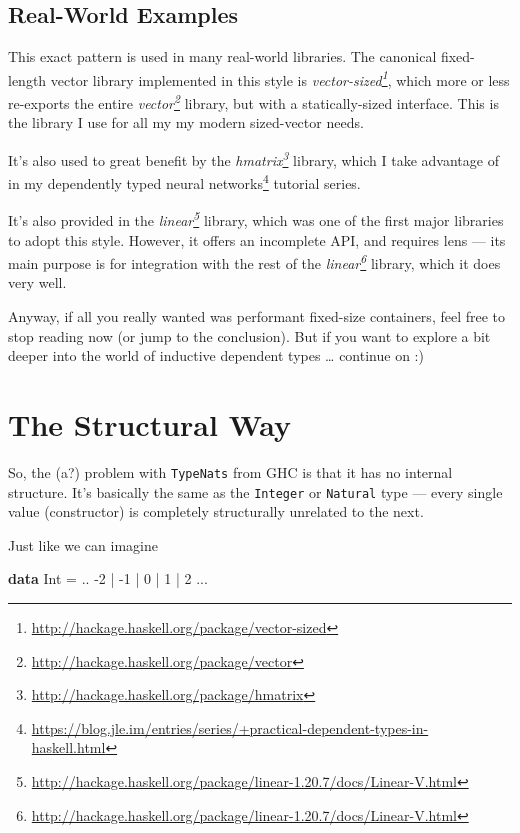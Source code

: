 \documentclass[]{article}
\newenvironment{Shaded}{}{}
\newcommand{\KeywordTok}[1]{\textcolor[rgb]{0.00,0.44,0.13}{\textbf{#1}}}
\newcommand{\DataTypeTok}[1]{\textcolor[rgb]{0.56,0.13,0.00}{#1}}
\newcommand{\DecValTok}[1]{\textcolor[rgb]{0.25,0.63,0.44}{#1}}
\newcommand{\FunctionTok}[1]{\textcolor[rgb]{0.02,0.16,0.49}{#1}}
\renewcommand{\href}[2]{#2\footnote{\url{#1}}}
\begin{document}
\subsection{Real-World Examples}\label{real-world-examples}

This exact pattern is used in many real-world libraries. The canonical
fixed-length vector library implemented in this style is
\emph{\href{http://hackage.haskell.org/package/vector-sized}{vector-sized}},
which more or less re-exports the entire
\emph{\href{http://hackage.haskell.org/package/vector}{vector}} library, but
with a statically-sized interface. This is the library I use for all my my
modern sized-vector needs.

It's also used to great benefit by the
\emph{\href{http://hackage.haskell.org/package/hmatrix}{hmatrix}} library, which
I take advantage of in my
\href{https://blog.jle.im/entries/series/+practical-dependent-types-in-haskell.html}{dependently
typed neural networks} tutorial series.

It's also provided in the
\emph{\href{http://hackage.haskell.org/package/linear-1.20.7/docs/Linear-V.html}{linear}}
library, which was one of the first major libraries to adopt this style.
However, it offers an incomplete API, and requires lens --- its main purpose is
for integration with the rest of the
\emph{\href{http://hackage.haskell.org/package/linear-1.20.7/docs/Linear-V.html}{linear}}
library, which it does very well.

Anyway, if all you really wanted was performant fixed-size containers, feel free
to stop reading now (or jump to the conclusion). But if you want to explore a
bit deeper into the world of inductive dependent types \ldots{} continue on :)

\section{The Structural Way}\label{the-structural-way}

So, the (a?) problem with \texttt{TypeNats} from GHC is that it has no internal
structure. It's basically the same as the \texttt{Integer} or \texttt{Natural}
type --- every single value (constructor) is completely structurally unrelated
to the next.

Just like we can imagine

\begin{Shaded}
\begin{Highlighting}[]
\KeywordTok{data} \DataTypeTok{Int} \FunctionTok{=} \FunctionTok{..} \FunctionTok{-}\DecValTok{2} \FunctionTok{|} \FunctionTok{-}\DecValTok{1} \FunctionTok{|} \DecValTok{0} \FunctionTok{|} \DecValTok{1} \FunctionTok{|} \DecValTok{2} \FunctionTok{...}
\end{Highlighting}
\end{Shaded}
\end{document}
